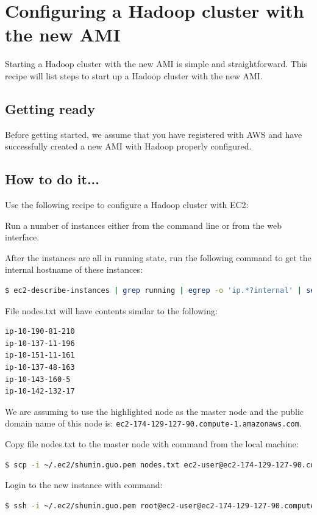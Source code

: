 \section{Configuring a Hadoop cluster with the new AMI}
Starting a Hadoop cluster with the new AMI is simple and straightforward. This recipe will list steps to start up a Hadoop cluster with the new AMI.
\subsection*{Getting ready}
Before getting started, we assume that you have registered with AWS and have successfully created a new AMI with Hadoop properly configured.
\subsection*{How to do it...}
Use the following recipe to configure a Hadoop cluster with EC2:

Run a number of instances either from the command line or from the web interface.

After the instances are all in running state, run the following command to get the internal hostname of these instances:
\lstset{style=bashstyle}
\begin{lstlisting}[language=bash]
$ ec2-describe-instances | grep running | egrep -o 'ip.*?internal' | sed -e 's/.ec2.internal//g' > nodes.txt
\end{lstlisting}

File nodes.txt will have contents similar to the following:
\lstset{style=bashstyle}
\begin{lstlisting}
ip-10-190-81-210
ip-10-137-11-196
ip-10-151-11-161
ip-10-137-48-163
ip-10-143-160-5
ip-10-142-132-17
\end{lstlisting}

We are assuming to use the highlighted node as the master node and the public domain name of this node is: \verb|ec2-174-129-127-90.compute-1.amazonaws.com|.

Copy file nodes.txt to the master node with command from the local machine:
\lstset{style=bashstyle}
\begin{lstlisting}[language=bash]
$ scp -i ~/.ec2/shumin.guo.pem nodes.txt ec2-user@ec2-174-129-127-90.compute-1.amazonaws.com:~/
\end{lstlisting}
Login to the new instance with command:
\lstset{style=bashstyle}
\begin{lstlisting}[language=bash]
$ ssh -i ~/.ec2/shumin.guo.pem root@ec2-user@ec2-174-129-127-90.compute-1.amazonaws.com
\end{lstlisting}


